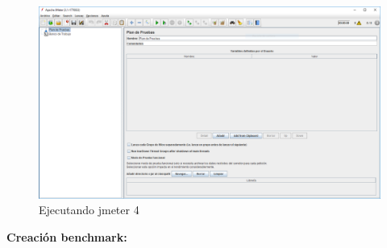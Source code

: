 \begin{enumerate}
	\begin{figure}[H] %
		\centering
		\includegraphics[scale=0.3]{pics/4}  %
		\caption{Ejecutando jmeter 4} \label{fig:jmt4}
	\end{figure}
\end{enumerate}

\textbf{Creación benchmark: }

